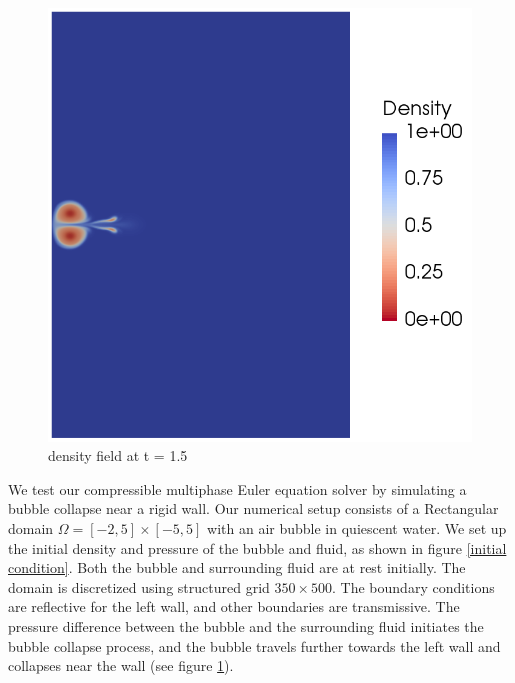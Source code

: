 \documentclass[12pt]{article}
\begin{document}
\begin{figure}[h]
\begin{minipage}[b]{0.42\textwidth}
	  \includegraphics[width=\textwidth]{bubble_collapse.png}
	  \caption{density field at t = 1.5}
	  \label{density plot at t = 1.5}
	\end{minipage}
  \end{figure}
We test our compressible multiphase Euler equation solver by simulating a bubble collapse near a rigid wall. Our numerical setup consists of a Rectangular domain $\Omega = [-2,5]\times[-5,5]$ with an air bubble in quiescent water. We set up the initial density and pressure of the bubble and fluid, as shown in figure \ref{initial condition}. Both the bubble and surrounding fluid are at rest initially. The domain is discretized using structured grid $350 \times 500$. The boundary conditions are reflective for the left wall, and other boundaries are transmissive. The pressure difference between the bubble and the surrounding fluid initiates the bubble collapse process, and the bubble travels further towards the left wall and collapses near the wall (see figure \ref{density plot at t = 1.5}).  
\end{document}
